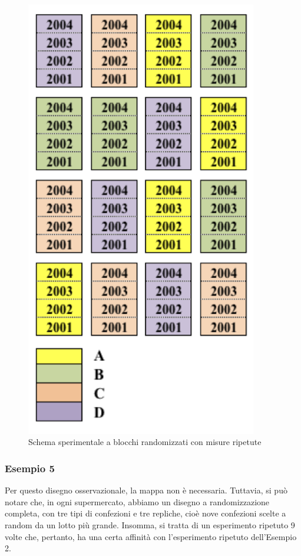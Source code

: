 \documentclass[a4paper,12pt,oneside]{book}
\begin{document}
\begin{figure}
\centering
\includegraphics[width=0.90000\textwidth]{_images/Mappa4.png}
\caption{Schema sperimentale a blocchi randomizzati con misure ripetute}
\end{figure}

\subsubsection{Esempio 5}\label{esempio-5-1}

Per questo disegno osservazionale, la mappa non è necessaria. Tuttavia,
si può notare che, in ogni supermercato, abbiamo un disegno a
randomizzazione completa, con tre tipi di confezioni e tre repliche,
cioè nove confezioni scelte a random da un lotto più grande. Insomma, si
tratta di un esperimento ripetuto 9 volte che, pertanto, ha una certa
affinità con l'esperimento ripetuto dell'Esempio 2.
\end{document}
